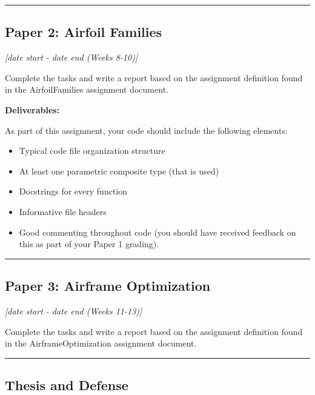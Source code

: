 \documentclass[12pt]{article}
\begin{document}
\vspace{1em}\hrule\vspace{1em}
\subsection{Paper 2: Airfoil Families}
\label{ssec:p2}

\textit{[date start - date end (Weeks 8-10)]}

\bigskip

Complete the tasks and write a report based on the assignment definition found in the AirfoilFamilies assignment document.

\bigskip

\noindent \textbf{Deliverables:}

As part of this assignment, your code should include the following elements:
\begin{itemize}
	\item Typical code file organization structure
	\item At least one parametric composite type (that is used)
	\item Docstrings for every function
	\item Informative file headers
	\item Good commenting throughout code (you should have received feedback on this as part of your Paper 1 grading).
\end{itemize}


\vspace{1em}\hrule\vspace{1em}
\subsection{Paper 3: Airframe Optimization}
\label{ssec:p3}

\textit{[date start - date end (Weeks 11-13)]}

\bigskip

Complete the tasks and write a report based on the assignment definition found in the AirframeOptimization assignment document.
	
\bigskip

\vspace{1em}\hrule\vspace{1em}
\subsection{Thesis and Defense}
\label{sec:finalreport}
\end{document}
